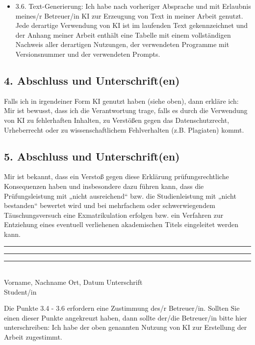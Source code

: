 {\begin{itemize}
            \item[$\square$] 3.6. Text-Generierung: Ich habe nach vorheriger Absprache und mit Erlaubnis meines/r Betreuer/in KI zur Erzeugung von Text in meiner Arbeit genutzt. Jede derartige Verwendung von KI ist im laufenden Text gekennzeichnet und der Anhang meiner Arbeit enthält eine Tabelle mit einem vollständigen Nachweis aller derartigen Nutzungen, der verwendeten Programme mit Versionsnummer und der verwendeten Prompts.
        \end{itemize}

        \subsection*{4. Abschluss und Unterschrift(en)}
        Falls ich in irgendeiner Form KI genutzt haben (siehe oben), dann erkläre ich:
        Mir ist bewusst, dass ich die Verantwortung trage, falls es durch die Verwendung von KI zu fehlerhaften Inhalten, zu Verstößen gegen das Datenschutzrecht, Urheberrecht oder zu wissenschaftlichem Fehlverhalten (z.B. Plagiaten) kommt.

        \subsection*{5. Abschluss und Unterschrift(en)}
        Mir ist bekannt, dass ein Verstoß gegen diese Erklärung prüfungsrechtliche Konsequenzen haben und insbesondere dazu führen kann, dass die Prüfungsleistung mit „nicht ausreichend“ bzw. die Studienleistung mit „nicht bestanden“ bewertet wird und bei mehrfachem oder schwerwiegendem Täuschungsversuch eine Exmatrikulation erfolgen bzw. ein Verfahren zur Entziehung eines eventuell verliehenen akademischen Titels eingeleitet werden kann.

        \vspace{1.5cm}
        \noindent
        \rule{5cm}{0.4pt} \hfill \rule{4cm}{0.4pt} \hfill \rule{5cm}{0.4pt} \\
        Vorname, Nachname \hfill Ort, Datum \hfill Unterschrift \\
        Student/in

        \vspace{1cm}
        \noindent
        Die Punkte 3.4 - 3.6 erfordern eine Zustimmung des/r Betreuer/in. Sollten Sie einen dieser Punkte angekreuzt haben, dann sollte der/die Betreuer/in bitte hier unterschreiben:
        Ich habe der oben genannten Nutzung von KI zur Erstellung der Arbeit zugestimmt.

}
